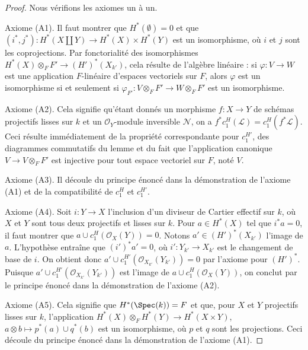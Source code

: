 \begin{proof}
Nous vérifions les axiomes un à un.

\medskip\noindent
Axiome (A1). Il faut montrer que $H^*(\emptyset) = 0$ et que
$(i^*, j^*) : H^*(X \amalg Y) \to H^*(X) \times H^*(Y)$
est un isomorphisme, où $i$ et $j$ sont les coprojections.
Par fonctorialité des isomorphismes
$H^*(X) \otimes_F F' \to (H')^*(X_{k'})$, cela
résulte de l'algèbre linéaire : si $\varphi : V \to W$ est une application $F$-linéaire
d'espaces vectoriels sur $F$, alors $\varphi$ est un isomorphisme si et seulement si
$\varphi_{F'} : V \otimes_F F' \to W \otimes_F F'$ est un isomorphisme.

\medskip\noindent
Axiome (A2). Cela signifie qu'étant donnés un morphisme $f : X \to Y$ de schémas projectifs lisses
sur $k$ et un $\mathcal{O}_Y$-module inversible $\mathcal{N}$,
on a $f^*c_1^H(\mathcal{L}) = c_1^H(f^*\mathcal{L})$. Ceci résulte immédiatement
de la propriété correspondante pour $c_1^{H'}$, des diagrammes commutatifs
du lemme et du fait que l'application canonique
$V \to V \otimes_F F'$ est injective pour tout espace vectoriel sur $F$, noté $V$.

\medskip\noindent
Axiome (A3). Il découle du principe énoncé dans la démonstration de
l'axiome (A1) et de la compatibilité de $c_1^H$ et $c_1^{H'}$.

\medskip\noindent
Axiome (A4). Soit $i : Y \to X$ l'inclusion d'un diviseur de Cartier
effectif sur $k$, où $X$ et $Y$ sont tous deux projectifs et lisses
sur $k$. Pour $a \in H^*(X)$ tel que
$i^*a = 0$, il faut montrer que $a \cup c_1^H(\mathcal{O}_X(Y)) = 0$.
Notons $a' \in (H')^*(X_{k'})$ l'image de $a$.
L'hypothèse entraîne que $(i')^*a' = 0$, où $i' : Y_{k'} \to X_{k'}$
est le changement de base de $i$. On obtient donc
$a' \cup c_1^{H'}(\mathcal{O}_{X_{k'}}(Y_{k'})) = 0$ par l'axiome
pour $(H')^*$. Puisque $a' \cup c_1^{H'}(\mathcal{O}_{X_{k'}}(Y_{k'}))$
est l'image de $a \cup c_1^H(\mathcal{O}_X(Y))$, on conclut par
le principe énoncé dans la démonstration de l'axiome (A2).

\medskip\noindent
Axiome (A5). Cela signifie que $H^*(\Spec(k)) = F$ et que, pour $X$ et $Y$ projectifs
lisses sur $k$, l'application $H^*(X) \otimes_F H^*(Y) \to H^*(X \times Y)$,
$a \otimes b \mapsto p^*(a) \cup q^*(b)$ est un isomorphisme,
où $p$ et $q$ sont les projections. Ceci découle du principe
énoncé dans la démonstration de l'axiome (A1).


\end{proof}
